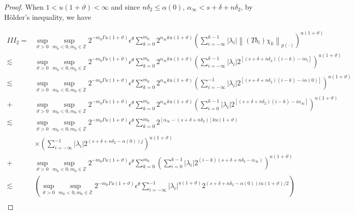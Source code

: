 \documentclass[oneside,reqno]{amsart}
\numberwithin{equation}{section}
\theoremstyle{definition}
\begin{document}
\begin{proof}
When $1<u(1+\vartheta)<\infty$ and since $n \delta_{2} \leq  \alpha(0)$, $\alpha_{\infty}<s+\delta+n \delta_{2}$, by H\"older's inequality, we have


\begin{align*}
I I I_{2}=& \sup_{\vartheta>0 }\sup _{m_0<0, m_0\in  \mathbb{Z}} 2^{-m_0\Gamma u(1+\vartheta)} \epsilon  ^\theta \sum_{k=0}^{m_0} 2^{\alpha_{\infty} k u(1+\vartheta)}\left(\sum_{i=-\infty}^{k-1}\left|\lambda_{i}\right|\left\|\left(T b_{i}\right) \chi_{k}\right\|_{{p(\cdot)}}\right)^{u(1+\vartheta)} \\
 \lesssim & \sup_{\vartheta>0 }\sup _{m_0<0, m_0\in  \mathbb{Z}} 2^{-m_0\Gamma u(1+\vartheta)} \epsilon  ^\theta \sum_{k=0}^{m_0} 2^{\alpha_{\infty} k u(1+\vartheta)}\left(\sum_{i=-\infty}^{k-1}\left|\lambda_{i}\right| 2^{\left[\left(s+\delta+n \delta_{2}\right)(i-k)-i \alpha_{i}\right]}\right)^{u(1+\vartheta)} \\
\lesssim & \sup_{\vartheta>0 }\sup _{m_0<0, m_0\in  \mathbb{Z}} 2^{-m_0\Gamma u(1+\vartheta)} \epsilon  ^\theta \sum_{k=0}^{m_0} 2^{\alpha_{\infty} k u(1+\vartheta)}\left(\sum_{i=-\infty}^{-1}\left|\lambda_{i}\right| 2^{\left[\left(s+\delta+n \delta_{2}\right)(i-k)-i \alpha(0)\right]}\right)^{u(1+\vartheta)} \\
 +&\sup_{\vartheta>0 }\sup _{m_0<0, m_0\in  \mathbb{Z}} 2^{-m_0\Gamma u(1+\vartheta)} \epsilon  ^\theta \sum_{k=0}^{m_0} 2^{\alpha_{\infty} k u(1+\vartheta)}\left(\sum_{i=0}^{k-1}\left|\lambda_{i}\right| 2^{\left[\left(s+\delta+n \delta_{2}\right)(i-k)-i \alpha_{\infty}\right]}\right)^{u(1+\vartheta)} \\
\lesssim & \sup_{\vartheta>0 }\sup _{m_0<0, m_0\in  \mathbb{Z}} 2^{-m_0\Gamma u(1+\vartheta)} \epsilon  ^\theta \sum_{k=0}^{m_0} 2^{\left[\alpha_{\infty}-\left(s+\delta+n \delta_{2}\right)\right] k u(1+\vartheta)} \\
 &\times \left(\sum_{i=-\infty}^{-1}\left|\lambda_{i}\right| 2^{\left(s+\delta+n \delta_{2}-\alpha(0)\right) j}\right)^{u(1+\vartheta)} \\
+& \sup_{\vartheta>0 }\sup _{m_0<0, m_0\in  \mathbb{Z}} 2^{-m_0\Gamma u(1+\vartheta)} \epsilon  ^\theta \sum_{k=0}^{m_0}\left(\sum_{i=0}^{k-1}\left|\lambda_{i}\right| 2^{(i-k)\left(s+\delta+n \delta_{2}-\alpha_{\infty}\right)}\right)^{u(1+\vartheta)} \\
\lesssim & \left(\sup_{\vartheta>0 }\sup _{m_0<0, m_0\in  \mathbb{Z}} 2^{-m_0\Gamma u(1+\vartheta)} \epsilon  ^\theta\sum_{i=-\infty}^{-1}\left|\lambda_{i}\right|^{u(1+\vartheta)} 2^{\left(s+\delta+n \delta_{2}-\alpha(0)\right) iu (1+\vartheta) / 2}\right) \\

\end{align*}
\end{proof}
\end{document}
